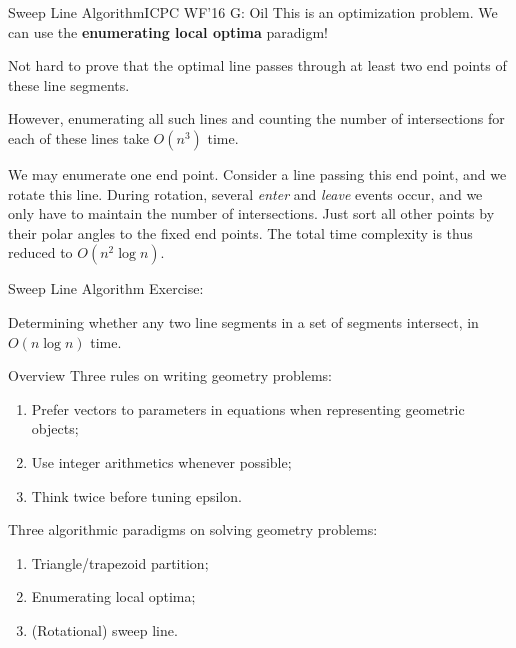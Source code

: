 \documentclass{beamer}
\begin{document}
\begin{frame}{Sweep Line Algorithm}{ICPC WF'16 G: Oil}
This is an optimization problem. We can use the \textbf{enumerating local optima} paradigm!

\pause

Not hard to prove that the optimal line passes through at least two end points of these line segments.

\pause

However, enumerating all such lines and counting the number of intersections for each of these lines take $O(n^3)$ time.

\pause

We may enumerate one end point. Consider a line passing this end point, and we rotate this line. During rotation, several \textit{enter} and \textit{leave} events occur, and we only have to maintain the number of intersections. Just sort all other points by their polar angles to the fixed end points. The total time complexity is thus reduced to $O(n^2 \log n)$.
\end{frame}

\begin{frame}{Sweep Line Algorithm}
Exercise: 

Determining whether any two line segments in a set of segments intersect, in $O(n \log n)$ time. 
\end{frame}

\begin{frame}{Overview}
Three rules on writing geometry problems:
\begin{enumerate}
	\item Prefer vectors to parameters in equations when representing geometric objects;
	\item Use integer arithmetics whenever possible;
	\item Think twice before tuning epsilon.
\end{enumerate}

Three algorithmic paradigms on solving geometry problems:
\begin{enumerate}
	\item Triangle/trapezoid partition;
	\item Enumerating local optima;
	\item (Rotational) sweep line.
\end{enumerate}
\end{frame}
\end{document}
